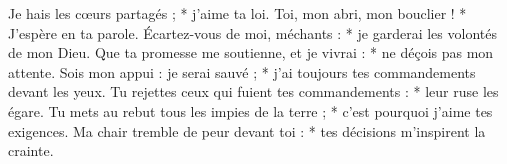 Je hais les cœurs partagés ; *
j’aime ta loi.
\versseparator
Toi, mon abri, mon bouclier ! *
J’espère en ta parole.
\versseparator
Écartez-vous de moi, méchants : *
je garderai les volontés de mon Dieu.
\versseparator
Que ta promesse me soutienne, et je vivrai : *
ne déçois pas mon attente.
\versseparator
Sois mon appui : je serai sauvé ; *
j’ai toujours tes commandements devant les yeux.
\versseparator
Tu rejettes ceux qui fuient tes commandements : *
leur ruse les égare.
\versseparator
Tu mets au rebut tous les impies de la terre ; *
c’est pourquoi j’aime tes exigences.
\versseparator
Ma chair tremble de peur devant toi : *
tes décisions m’inspirent la crainte.

